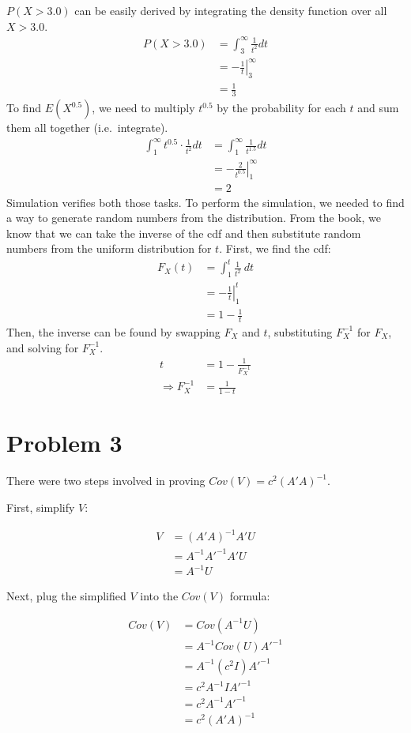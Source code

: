\documentclass{article}
\begin{document}
$P( X > 3.0 )$ can be easily derived by integrating the density function over
all $X > 3.0$.
\begin{align*}
  P( X > 3.0 ) &= \int_{3}^{\infty} \frac{1}{t^2} dt \\
               &= \left.-\frac{1}{t} \right|_3^\infty \\
               &= \frac{1}{3}
\end{align*}
To find $E(X^{0.5})$, we need to multiply $t^{0.5}$ by the probability for each
$t$ and sum them all together (i.e.\ integrate).
\begin{align*}
  \int_1^\infty t^{0.5}\cdot\frac{1}{t^2} dt &= \int_1^\infty \frac{1}{t^{1.5}}
  dt \\
  &=\left. - \frac{2}{t^{0.5}} \right|_1^\infty \\
  &= 2
\end{align*}
Simulation verifies both those tasks. To perform the simulation, we needed to
find a way to generate random numbers from the distribution. From the book, we
know that we can take the inverse of the cdf and then substitute random
numbers from the uniform distribution for $t$. First, we find the cdf:
\begin{align*}
  F_X(t) &= \int_1^t \frac{1}{t^2} \ dt \\
         &= \left. - \frac{1}{t} \right|_1^t \\
         &= 1 - \frac{1}{t}
\end{align*}
Then, the inverse can be found by swapping $F_X$ and $t$, substituting
$F_X^{-1}$ for $F_X$, and solving for $F_X^{-1}$.
\begin{align*}
  t &= 1 - \frac{1}{F_X^{-1}} \\
  \Rightarrow F_X^{-1} &= \frac{1}{1 - t}
\end{align*}

\section*{Problem 3}

There were two steps involved in proving $Cov(V) = c^{2}(A'A)^{-1}$.

First, simplify $V$:

\begin{align*}
  V &= (A'A)^{-1}A'U \\
    &= A^{-1}A'^{-1}A'U \\
    &= A^{-1}U
\end{align*}

Next, plug the simplified $V$ into the $Cov(V)$ formula:

\begin{align*}
  Cov(V) &= Cov(A^{-1}U) \\
         &= A^{-1}Cov(U)A'^{-1} \\
         &= A^{-1}(c^{2}I)A'^{-1} \\
         &= c^{2}A^{-1}IA'^{-1} \\
         &= c^{2}A^{-1}A'^{-1} \\
         &= c^{2}(A'A)^{-1}
\end{align*}
\end{document}
